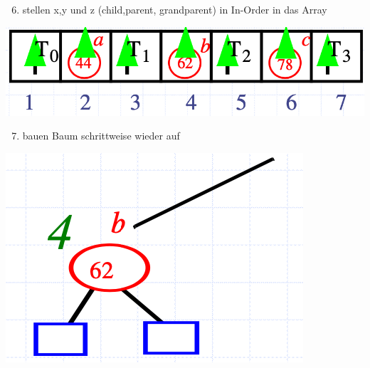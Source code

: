 \begin{enumerate}
    \setcounter{enumi}{5}
    \item stellen x,y und z (child,parent, grandparent) in In-Order in das Array
\end{enumerate}
\vspace{-8pt}
\begin{center}
    \includegraphics[scale=.2]{graphic/02 AVLTrees/Cut-Link4.png}
\end{center}
\vspace{-8pt}

\begin{enumerate}
    \setcounter{enumi}{6}
    \item bauen Baum schrittweise wieder auf
\end{enumerate}
\vspace{-8pt}
\begin{center}
    \includegraphics[scale=.25]{graphic/02 AVLTrees/Cut-Link5.png}
\end{center}
\vspace{-8pt}

